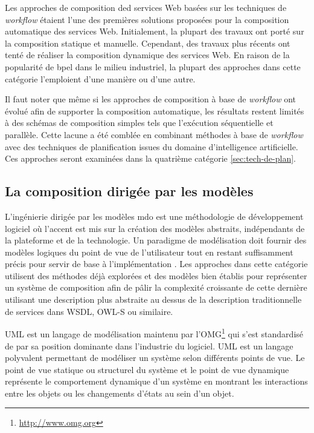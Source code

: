   Les approches de composition ded services Web basées sur les
  techniques de \textit{workflow} étaient l'une des premières solutions
  proposées pour la composition automatique des services
  Web. Initialement, la plupart des travaux ont porté sur la
  composition statique et manuelle. Cependant, des travaux plus récents
  \cite{majithia2004framework, ardagna2007paws, fujii2006semantics,
    fujii2009semantics} ont tenté de réaliser la composition
  dynamique des services Web. En raison de la popularité de
  \acrshort{bpel} dans le milieu industriel, la plupart des approches
  dans cette catégorie l'emploient d'une manière ou d'une
  autre.\medskip

  Il faut noter que même si les approches
  de composition à base de \textit{workflow} ont évolué afin de
  supporter la composition automatique, les résultats restent limités à
  des schémas de composition simples tels que l'exécution séquentielle
  et parallèle. Cette lacune a été comblée en combinant méthodes à
  base de \textit{workflow} avec des techniques de planification
  issues du domaine d'intelligence artificielle. Ces approches seront
  examinées dans la quatrième catégorie \ref{sec:tech-de-plan}.

  \subsection{La composition dirigée par les modèles}
  \label{sec:model-based-composition}
  L'ingénierie dirigée par les modèles \acrshort{mdo} est une
  méthodologie de développement logiciel où l'accent est mis sur la
  création des modèles abstraits, indépendants de la plateforme et de
  la technologie.
  Un paradigme de modélisation doit fournir des
  modèles logiques du point de vue de l'utilisateur tout en restant
  suffisamment précis pour servir de base à l'implémentation
  \cite{dumez2010approche}. Les approches dans cette catégorie
  utilisent des méthodes déjà explorées et des modèles bien établis
  pour représenter un système de composition afin de pâlir la
  complexité croissante de cette dernière utilisant une description
  plus abstraite au dessus de la description traditionnelle de
  services dans \textsc{WSDL}, \textsc{OWL-S} ou similaire.\medskip

  \textsc{UML} \cite{rumbaugh2004unified} est un langage de
  modélisation maintenu par
  l'\textsc{OMG}\footnote{\url{http://www.omg.org}} qui s'est
  standardisé de par sa position dominante dans l'industrie du
  logiciel. \textsc{UML} est un langage polyvalent permettant de
  modéliser un système selon différents points de vue. Le point de vue
  statique ou structurel du système et le point de vue dynamique
  représente le comportement dynamique d'un système en montrant les
  interactions entre les objets ou les changements d'états au sein
  d'un objet.\medskip

